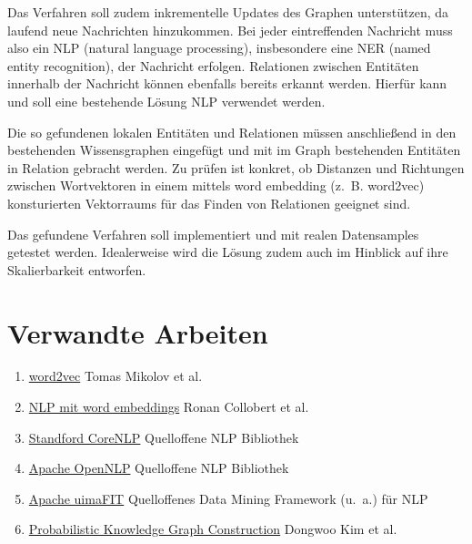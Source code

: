 \documentclass[12pt,a4paper,bibliography=totocnumbered,listof=totocnumbered]{scrartcl}
\begin{document}
Das Verfahren soll zudem inkrementelle Updates des Graphen unterstützen, da laufend neue Nachrichten hinzukommen. Bei jeder eintreffenden Nachricht muss also ein NLP (natural language processing), insbesondere eine NER (named entity recognition), der Nachricht erfolgen. Relationen zwischen Entitäten innerhalb der Nachricht können ebenfalls bereits erkannt werden. Hierfür kann und soll eine bestehende Lösung NLP verwendet werden.

Die so gefundenen lokalen Entitäten und Relationen müssen anschließend in den bestehenden Wissensgraphen eingefügt und mit im Graph bestehenden Entitäten in Relation gebracht werden. Zu prüfen ist konkret, ob Distanzen und Richtungen zwischen Wortvektoren in einem mittels word embedding (z.~B. word2vec) konsturierten Vektorraums für das Finden von Relationen geeignet sind.

Das gefundene Verfahren soll implementiert und mit realen Datensamples getestet werden. Idealerweise wird die Lösung zudem auch im Hinblick auf ihre Skalierbarkeit entworfen.

\section{Verwandte Arbeiten}
{\begin{enumerate}
	\item \href{http://papers.nips.cc/paper/5021-distributed-representations-of-words-and-phrases-and-their-compositionality.pdf}{word2vec} Tomas Mikolov et al.
	\item \href{https://arxiv.org/pdf/1103.0398.pdf}{NLP mit word embeddings} Ronan Collobert et al.
	\item \href{http://stanfordnlp.github.io/CoreNLP/}{Standford CoreNLP} Quelloffene NLP Bibliothek
	\item \href{https://opennlp.apache.org/}{Apache OpenNLP} Quelloffene NLP Bibliothek
	\item \href{https://uima.apache.org/uimafit.html}{Apache uimaFIT\textsuperscript{\texttrademark}} Quelloffenes Data Mining Framework (u.~a.) für NLP
	\item \href{http://www.ong-home.my/papers/kim16knowledge-graph-long.pdf}{Probabilistic Knowledge Graph Construction} Dongwoo Kim et al.
\end{enumerate}}
\end{document}
